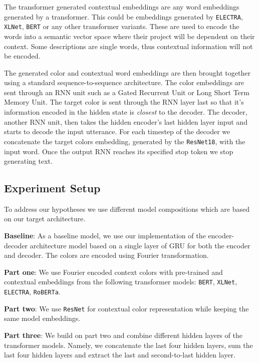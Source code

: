 \par
The transformer generated contextual embeddings are any word embeddings generated by a transformer. This could be embeddings generated by \texttt{ELECTRA}, \texttt{XLNet}, \texttt{BERT} or any other transformer variants. These are used to encode the words into a semantic vector space where their project will be dependent on their context. Some descriptions are single words, thus contextual information will not be encoded.

\par
The generated color and contextual word embeddings are then brought together using a standard sequence-to-sequence architecture. The color embeddings are sent through an RNN unit such as a Gated Recurrent Unit or Long Short Term Memory Unit. The target color is sent through the RNN layer last so that it’s information encoded in the hidden state is \emph{closest} to the decoder. The decoder, another RNN unit,  then takes the hidden encoder's last hidden layer input and starts to decode the input utterance. For each timestep of the decoder we concatenate the target colors embedding, generated by the \texttt{ResNet18}, with the input word. Once the output RNN reaches its specified stop token we stop generating text.

\subsection{Experiment Setup}
To address our hypotheses we use different model compositions which are based on our target architecture.

\textbf{Baseline}:
As a baseline model, we use our implementation of the encoder-decoder architecture model based on a single layer of GRU for both the encoder and decoder. The colors are encoded using Fourier transformation.

\textbf{Part one}:
We use Fourier encoded context colors with pre-trained and contextual embeddings from the following transformer models: \texttt{BERT}, \texttt{XLNet}, \texttt{ELECTRA}, \texttt{RoBERTa}.

\textbf{Part two}:
We use \texttt{ResNet} for contextual color representation while keeping the same model embeddings.

\textbf{Part three}:
We build on part two and combine different hidden layers of the transformer models. Namely, we concatenate the last four hidden layers, sum the last four hidden layers and extract the last and second-to-last hidden layer.